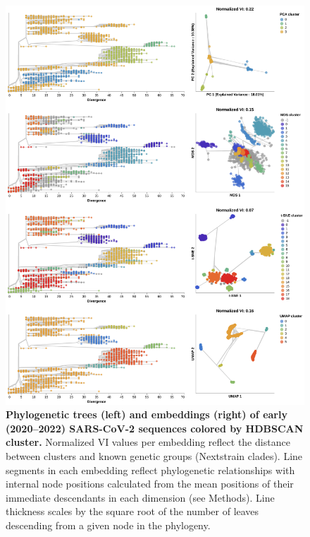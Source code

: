 \documentclass[10pt,letterpaper]{article}
\begin{document}
\begin{figure}[!h]
\includegraphics[width=\columnwidth]{figures/sarscov2-embeddings-by-cluster-vs-Nextstrain_clade.png}
\caption{{\bf Phylogenetic trees (left) and embeddings (right) of early (2020--2022) SARS-CoV-2 sequences colored by HDBSCAN cluster.}
  Normalized VI values per embedding reflect the distance between clusters and known genetic groups (Nextstrain clades).
  Line segments in each embedding reflect phylogenetic relationships with internal node positions calculated from the mean positions of their immediate descendants in each dimension (see Methods).
  Line thickness scales by the square root of the number of leaves descending from a given node in the phylogeny.
}
\label{fig:sars-cov-2-2020-2022-clusters-vs-Nextstrain-clade}
\end{figure}
\end{document}
